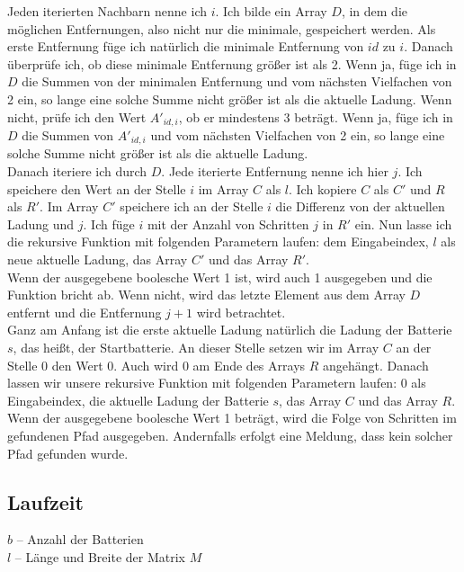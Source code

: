 \documentclass[a4paper,10pt,ngerman]{scrartcl}
\begin{document}
Jeden iterierten Nachbarn nenne ich $i$.
Ich bilde ein Array $D$, in dem die möglichen Entfernungen, also nicht nur die minimale, gespeichert werden. Als erste Entfernung
füge ich natürlich die minimale Entfernung von $id$ zu $i$. Danach überprüfe ich, ob diese minimale Entfernung größer ist als 2.
Wenn ja, füge ich in $D$ die Summen von der minimalen Entfernung und vom nächsten Vielfachen von 2 ein,
so lange eine solche Summe nicht
größer ist als die aktuelle Ladung. Wenn nicht, prüfe ich den Wert $A'_{id, i}$, ob er mindestens 3 beträgt.
Wenn ja, füge ich in $D$ die Summen von $A'_{id, i}$ und vom nächsten Vielfachen von 2 ein, so lange eine solche Summe nicht
größer ist als die aktuelle Ladung.\\
Danach iteriere ich durch $D$. Jede iterierte Entfernung nenne ich hier $j$.
Ich speichere den Wert an der Stelle $i$ im Array $C$ als $l$.
Ich kopiere $C$ als $C'$ und $R$ als $R'$.
Im Array $C'$ speichere ich an der Stelle $i$ die Differenz von der aktuellen Ladung und $j$.
Ich füge $i$ mit der Anzahl von Schritten $j$ in $R'$ ein. Nun lasse ich die rekursive Funktion mit folgenden Parametern laufen:
dem Eingabeindex, $l$ als neue aktuelle Ladung, das Array $C'$ und das Array $R'$.\\
Wenn der ausgegebene boolesche Wert 1 ist, wird auch 1 ausgegeben und die Funktion bricht ab. Wenn nicht, wird das letzte Element
aus dem Array $D$ entfernt und die Entfernung $j+1$ wird betrachtet.\\

Ganz am Anfang ist die erste aktuelle Ladung natürlich die Ladung der Batterie $s$, das heißt, der Startbatterie. An dieser Stelle
setzen wir im Array $C$ an der Stelle $0$ den Wert 0. Auch wird 0 am Ende des Arrays $R$ angehängt.
Danach lassen wir unsere rekursive Funktion mit folgenden Parametern laufen: 0 als Eingabeindex, die aktuelle Ladung der Batterie $s$, 
das Array $C$ und das Array $R$.
Wenn der ausgegebene boolesche Wert 1 beträgt, wird die Folge von Schritten im gefundenen Pfad ausgegeben. Andernfalls erfolgt
eine Meldung, dass kein solcher Pfad gefunden wurde.

\newpage
\subsection{Laufzeit}\label{sec:time}

$b$ -- Anzahl der Batterien\\
$l$ -- Länge und Breite der Matrix $M$\\
\end{document}
